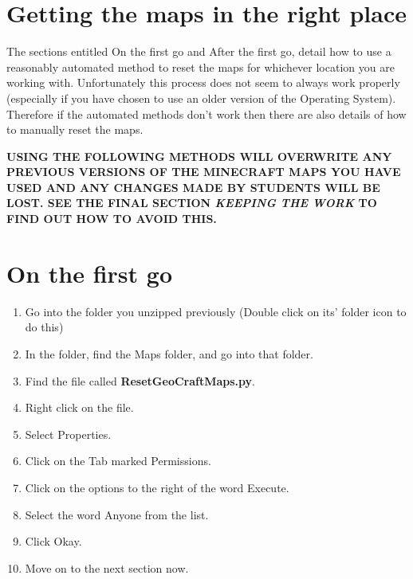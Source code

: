\documentclass{geocraft-worksheet-multipage}
\begin{document}
\section*{Getting the maps in the right place}
The sections entitled On the first go and After the first go, detail
how to use a reasonably automated method to reset the maps for
whichever location you are working with. Unfortunately this process
does not seem to always work properly (especially if you have chosen
to use an older version of the Operating System). Therefore if the
automated methods don't work then there are also details of how to
manually reset the maps. \vspace{0.5cm}

\textbf{USING THE FOLLOWING METHODS WILL OVERWRITE ANY PREVIOUS
  VERSIONS OF THE MINECRAFT MAPS YOU HAVE USED AND ANY CHANGES MADE BY
  STUDENTS WILL BE LOST. SEE THE FINAL SECTION \textit{KEEPING THE WORK} TO
  FIND OUT HOW TO AVOID THIS.}

\section*{On the first go}
\begin{enumerate}
\item Go into the folder you unzipped previously (Double click on its'
  folder icon to do this)
\item In the folder, find the Maps folder, and go into that folder.
\item Find the file called \textbf{ResetGeoCraftMaps.py}.
\item Right click on the file.
\item Select Properties.
\item Click on the Tab marked Permissions.
\item Click on the options to the right of the word Execute.
\item Select the word Anyone from the list.
\item Click Okay.
\item Move on to the next section now.
\end{enumerate}
\end{document}
